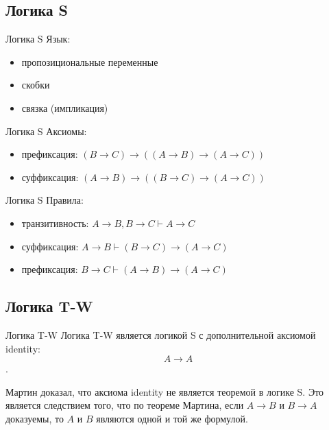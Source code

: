 \documentclass[14pt]{beamer}
\begin{document}
\subsection{Логика S}

\begin{frame}[nologo]{Логика S}
Язык:
\begin{itemize}
	\item пропозициональные переменные
	\item скобки
	\item связка (импликация)
\end{itemize}
\end{frame}

\begin{frame}[nologo]{Логика S}
Аксиомы:
\begin{itemize}
	\item префиксация: $(B \rightarrow C) \rightarrow ((A \rightarrow B) 
	\rightarrow (A \rightarrow C))$
	\item суффиксация: $(A \rightarrow B) \rightarrow ((B \rightarrow C) 
	\rightarrow (A \rightarrow C))$
\end{itemize}
\end{frame}

\begin{frame}[nologo]{Логика S}
Правила:
\begin{itemize}
	\item транзитивность: $A \rightarrow B, B \rightarrow C \vdash A 
	\rightarrow C$
	\item суффиксация: $A \rightarrow B \vdash (B \rightarrow C) \rightarrow (A 
	\rightarrow C)$
	\item префиксация: $B \rightarrow C \vdash (A \rightarrow B) \rightarrow (A 
	\rightarrow C)$
\end{itemize}
\end{frame}

\subsection{Логика T-W}

\begin{frame}[nologo]{Логика T-W}
Логика T-W является логикой S с дополнительной аксиомой identity: $$A 
\rightarrow A$$.

Мартин доказал, что аксиома identity не является теоремой в логике S. Это 
является следствием того, что по теореме Мартина, если $A \rightarrow B$ и $B 
\rightarrow A$ доказуемы, то $A$ и $B$ являются одной и той же формулой.
\end{frame}
\end{document}
